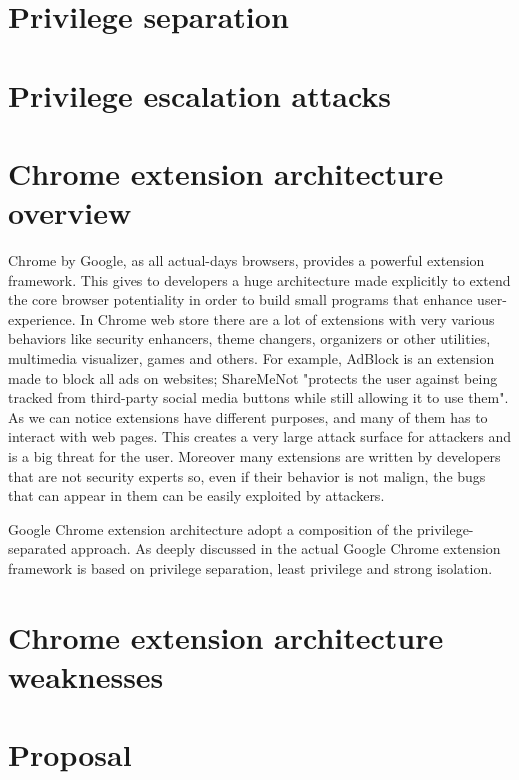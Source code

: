 \section{Privilege separation}
\label{sec:PriviSep}


\section{Privilege escalation attacks}
\label{sec:Escalation}

\section{Chrome extension architecture overview}
\label{sec:ExtOverview}
Chrome by Google, as all actual-days browsers, provides a powerful extension framework. This gives to developers a huge architecture made explicitly to extend the core browser potentiality in order to build small programs that enhance user-experience. In Chrome web store there are a lot of extensions with very various behaviors like security enhancers, theme changers, organizers or other utilities, multimedia visualizer, games and others. For example, AdBlock is an extension made to block all ads on websites; ShareMeNot "protects the user against being tracked from third-party social media buttons while still allowing it to use them"\cite{ShareMeNot}. As we can notice extensions have different purposes, and many of them has to interact with web pages. This creates a very large attack surface for attackers and is a big threat for the user. Moreover many extensions are written by developers that are not security experts so, even if their behavior is not malign, the bugs that can appear in them can be easily exploited by attackers.

Google Chrome extension architecture adopt a composition of the privilege-separated approach. As deeply discussed in \cite{ChromeExtSpec} the actual Google Chrome extension framework is based on privilege separation, least privilege and strong isolation. 

\section{Chrome extension architecture weaknesses}
\label{sec:ExtWeakness}

\section{Proposal}
\label{sec:Proposal}